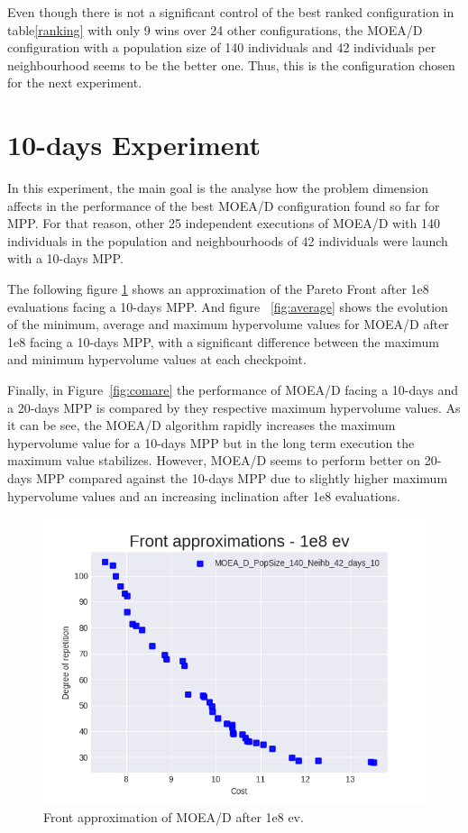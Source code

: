 Even though there is not a significant control of the best ranked configuration in table\ref{ranking} with only 9 wins over 24 other configurations, the MOEA/D configuration with a population size of 140 individuals and 42 individuals per neighbourhood seems to be the better one. Thus, this is the configuration chosen for the next experiment.


\section{10-days Experiment}
In this experiment, the main goal is the analyse how the problem dimension affects in the performance of the best MOEA/D configuration found so far for MPP. For that reason, other 25 independent executions of MOEA/D with 140 individuals in the population and neighbourhoods of 42 individuals were launch with a 10-days MPP.

The following figure \ref{fig:front} shows an approximation of the Pareto Front after 1e8 evaluations facing a 10-days MPP. And figure ~\ref{fig:average} shows the evolution of the minimum, average and maximum hypervolume values for MOEA/D after 1e8 facing a 10-days MPP, with a significant difference between the maximum and minimum hypervolume values at each checkpoint. 

Finally, in Figure~\ref{fig:comare} the performance of MOEA/D facing a 10-days and a 20-days MPP is compared by they respective maximum hypervolume values. As it can be see, the MOEA/D algorithm rapidly increases the maximum hypervolume value for a 10-days MPP but in the long term execution the maximum value stabilizes. However, MOEA/D seems to perform better on 20-days MPP compared against the 10-days MPP due to slightly higher maximum hypervolume values and an increasing inclination after 1e8 evaluations.
\begin{figure}[!h]
\centering
\includegraphics[scale=1.0]{../experiments/plots/fronts/MOEA_D_PopSize_140_Neihb_42_days_10_6.png}
\caption{Front approximation of MOEA/D after 1e8 ev.}
\label{fig:front}
\end{figure}

